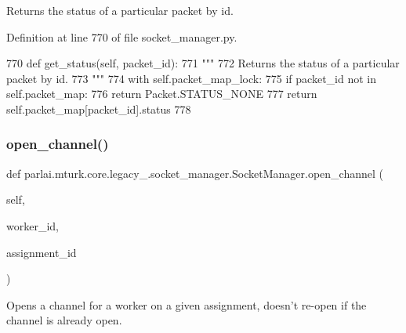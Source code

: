 \begin{DoxyVerb}Returns the status of a particular packet by id.
\end{DoxyVerb}
 

Definition at line 770 of file socket\+\_\+manager.\+py.


\begin{DoxyCode}
770     \textcolor{keyword}{def }get\_status(self, packet\_id):
771         \textcolor{stringliteral}{"""}
772 \textcolor{stringliteral}{        Returns the status of a particular packet by id.}
773 \textcolor{stringliteral}{        """}
774         with self.packet\_map\_lock:
775             \textcolor{keywordflow}{if} packet\_id \textcolor{keywordflow}{not} \textcolor{keywordflow}{in} self.packet\_map:
776                 \textcolor{keywordflow}{return} Packet.STATUS\_NONE
777             \textcolor{keywordflow}{return} self.packet\_map[packet\_id].status
778 
\end{DoxyCode}
\mbox{\label{classparlai_1_1mturk_1_1core_1_1legacy__2018_1_1socket__manager_1_1SocketManager_a736cdf9b5be6d3fee7f88cf7893b56f0}} 
\subsubsection{\texorpdfstring{open\+\_\+channel()}{open\_channel()}}
{\footnotesize\ttfamily def parlai.\+mturk.\+core.\+legacy\+\_.\+socket\+\_\+manager.\+Socket\+Manager.\+open\+\_\+channel (\begin{DoxyParamCaption}\item[{}]{self,  }\item[{}]{worker\+\_\+id,  }\item[{}]{assignment\+\_\+id }\end{DoxyParamCaption})}

\begin{DoxyVerb}Opens a channel for a worker on a given assignment, doesn't re-open if the
channel is already open.
\end{DoxyVerb}
 

